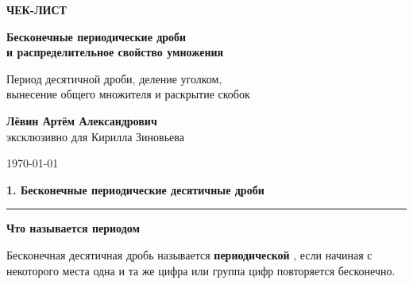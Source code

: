 \documentclass[a4paper,12pt]{article}
\newcommand{\sectiontitle}[1]{%
    \vspace{0.8em}
    {\Large\bfseries\textcolor{darkaccent}{#1}}\par
    \vspace{0.25em}
    \textcolor{accent}{\rule{\linewidth}{0.7pt}}
    \vspace{0.5em}
}
\newcommand{\subsectiontitle}[1]{%
    \vspace{0.6em}
    {\large\bfseries\textcolor{accent}{#1}}\par
    \vspace{0.2em}
}
\newcommand{\important}[1]{%
    \textbf{\textcolor{darkaccent}{#1}}
}
\begin{document}
\begin{titlepage}
\thispagestyle{empty}

\begin{center}

\vspace*{2.2cm}

{\Large\textcolor{accent}{\textbf{ЧЕК-ЛИСТ}}}

\vspace{0.8cm}

{\huge\bfseries
Бесконечные периодические дроби\\[0.25em]
и распределительное свойство умножения
}

\vspace{0.7cm}

{\large
Период десятичной дроби, деление уголком,\\
вынесение общего множителя и раскрытие скобок
}

\vfill

{\large
\textbf{Лёвин Артём Александрович}\\[0.4em]
эксклюзивно для Кирилла Зиновьева
}

\vspace{0.9cm}

{\large \today}

\vfill


\vspace{0.5cm}

\end{center}
\end{titlepage}


\sectiontitle{1. Бесконечные периодические десятичные дроби}

\subsectiontitle{Что называется периодом}

Бесконечная десятичная дробь называется
\important{периодической}, если начиная с некоторого места одна и та же
цифра или группа цифр повторяется бесконечно.
\end{document}
